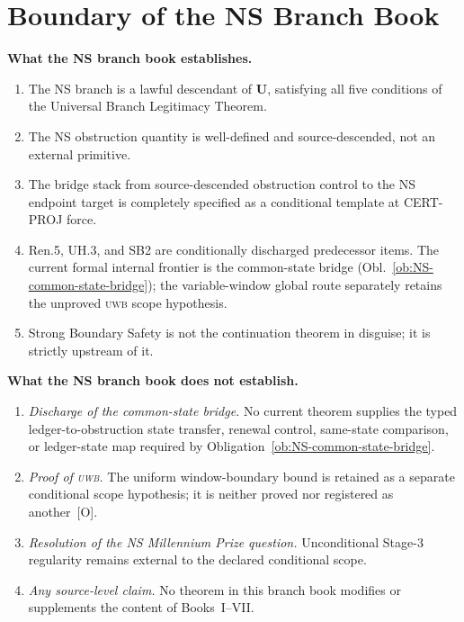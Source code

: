 \documentclass[12pt,oneside]{amsbook}
\theoremstyle{plain}
\theoremstyle{definition}
\theoremstyle{remark}
\begin{document}
\section{Boundary of the NS Branch Book}

\textbf{What the NS branch book establishes.}
\begin{enumerate}
 \item The NS branch is a lawful descendant of $\mathbf{U}$,
 satisfying all five conditions of the Universal Branch
 Legitimacy Theorem.
 \item The NS obstruction quantity is well-defined and
 source-descended, not an external primitive.
 \item The bridge stack from source-descended obstruction
 control to the NS endpoint target is completely specified as a
 conditional template at CERT-PROJ force.
 \item Ren.5, UH.3, and SB2 are conditionally discharged predecessor
 items. The current formal internal frontier is the common-state
 bridge (Obl.~\ref{ob:NS-common-state-bridge}); the variable-window
 global route separately retains the unproved \textsc{uwb} scope
 hypothesis.
 \item Strong Boundary Safety is not the continuation theorem
 in disguise; it is strictly upstream of it.
\end{enumerate}

\textbf{What the NS branch book does not establish.}
\begin{enumerate}
 \item \emph{Discharge of the common-state bridge.} No current
 theorem supplies the typed ledger-to-obstruction state transfer,
 renewal control, same-state comparison, or ledger-state map required
 by Obligation~\ref{ob:NS-common-state-bridge}.
 \item \emph{Proof of \textsc{uwb}.} The uniform window-boundary
 bound is retained as a separate conditional scope hypothesis; it is
 neither proved nor registered as another~[O].
 \item \emph{Resolution of the NS Millennium Prize question.}
 Unconditional Stage-3 regularity remains external to the declared
 conditional scope.
 \item \emph{Any source-level claim.} No theorem in this
 branch book modifies or supplements the content of
 Books~I--VII.
\end{enumerate}
\end{document}
